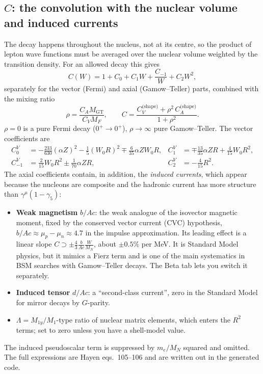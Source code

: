 \subsection{$C$: the convolution with the nuclear volume and induced currents}
The decay happens throughout the nucleus, not at its centre, so the product of lepton wave functions must be averaged over the nuclear volume weighted by the transition density. For an allowed decay this gives
\begin{equation}
C(W) = 1 + C_0 + C_1 W + \frac{C_{-1}}{W} + C_2 W^2,
\end{equation}
separately for the vector (Fermi) and axial (Gamow--Teller) parts, combined with the mixing ratio
\begin{equation}
\rho = \frac{C_A M_\text{GT}}{C_V M_F}, \qquad C = \frac{C_V^{\text{(shape)}} + \rho^2\, C_A^{\text{(shape)}}}{1 + \rho^2}.
\end{equation}
$\rho = 0$ is a pure Fermi decay ($0^+\to0^+$), $\rho\to\infty$ pure Gamow--Teller. The vector coefficients are
\begin{align}
C_0^V &= -\tfrac{233}{630}(\alpha Z)^2 - \tfrac15 (W_0R)^2 \mp \tfrac{6}{35}\alpha Z W_0 R, &
C_1^V &= \mp\tfrac{13}{35}\alpha Z R + \tfrac{4}{15}W_0R^2,\nonumber\\
C_{-1}^V &= \tfrac{2}{15}W_0R^2 \pm \tfrac{1}{70}\alpha Z R, &
C_2^V &= -\tfrac{4}{15}R^2 .
\end{align}
The axial coefficients contain, in addition, the \emph{induced currents}, which appear because the nucleons are composite and the hadronic current has more structure than $\gamma^\mu(1-\gamma_5)$:
\begin{itemize}
\item \textbf{Weak magnetism} $b/Ac$: the weak analogue of the isovector magnetic moment, fixed by the conserved vector current (CVC) hypothesis, $b/Ac \approx \mu_p - \mu_n \approx 4.7$ in the impulse approximation. Its leading effect is a linear slope $C \supset \pm\frac{4}{3}\frac{b}{Ac}\frac{W}{M_N}$, about $\pm0.5\%$ per MeV. It is Standard Model physics, but it mimics a Fierz term and is one of the main systematics in BSM searches with Gamow--Teller decays. The Beta tab lets you switch it separately.
\item \textbf{Induced tensor} $d/Ac$: a ``second-class current'', zero in the Standard Model for mirror decays by $G$-parity.
\item $\Lambda = M_{1y}/M_{1}$-type ratio of nuclear matrix elements, which enters the $R^2$ terms; set to zero unless you have a shell-model value.
\end{itemize}
The induced pseudoscalar term is suppressed by $m_e/M_N$ squared and omitted. The full expressions are Hayen eqs.\ 105--106 and are written out in the generated code.

